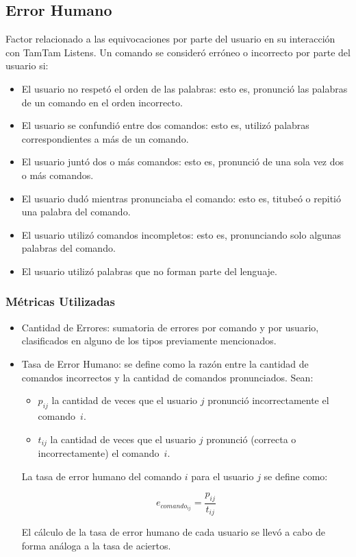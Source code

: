 
\subsection{Error Humano}
Factor relacionado a las equivocaciones por parte del usuario en su interacci\'on con
TamTam Listens.
Un comando se consider\'o err\'oneo o incorrecto por parte del usuario si:
\begin{itemize}
	\item El usuario no respet\'o el orden de las palabras: esto es, pronunci\'o las palabras de un comando en el orden incorrecto.
	\item El usuario se confundi\'o entre dos comandos: esto es, utiliz\'o palabras correspondientes a m\'as de un comando.
	\item El usuario junt\'o dos o m\'as comandos: esto es, pronunci\'o de una sola vez dos o m\'as comandos.
	\item El usuario dud\'o mientras pronunciaba el comando: esto es, titube\'o o repiti\'o una palabra del comando.
	\item El usuario utiliz\'o comandos incompletos: esto es, pronunciando solo algunas palabras del comando.
	\item El usuario utiliz\'o palabras que no forman parte del lenguaje.
\end{itemize}
\subsubsection{M\'etricas Utilizadas}
\begin{itemize}
	\item Cantidad de Errores: sumatoria de errores por comando y por usuario, clasificados en
	alguno de los tipos previamente mencionados.
	\item Tasa de Error Humano: se define como la raz\'on entre la cantidad de comandos incorrectos
	y la cantidad de comandos pronunciados.
	Sean:

	\begin{itemize}
		\item $p_{ij}$ la cantidad de veces que el usuario $j$ pronunci\'o incorrectamente el \mbox{comando $i$.}
		\item $t_{ij}$ la cantidad de veces que el usuario $j$ pronunci\'o (correcta o incorrectamente) el 
		\mbox{comando $i$.}
	\end{itemize}
	La tasa de error humano del comando $i$ para el usuario $j$ se define como: 

	\begin{equation*}
		e_{{comando}_{ij}}=\frac{p_{ij}}{t_{ij}}
	\end{equation*}

	El c\'alculo de la tasa de error humano de cada usuario se llev\'o a cabo de forma an\'aloga 
	a la tasa de aciertos.
\end{itemize}

